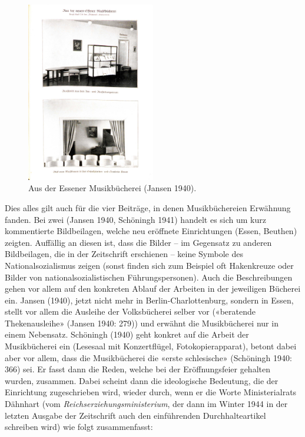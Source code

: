 \documentclass[a4paper,
fontsize=11pt,
oneside,
numbers=noperiodatend,
parskip=half-,
bibliography=totoc,
final
]{scrartcl}
\begin{document}
\begin{figure}
\centering
\includegraphics[width=0.5\textwidth]{files/Jansen_1940.jpg}
\caption{Aus der Essener Musikbücherei (Jansen 1940).}
\end{figure}

Dies alles gilt auch für die vier Beiträge, in denen Musikbüchereien
Erwähnung fanden. Bei zwei (Jansen 1940, Schöningh 1941) handelt es sich
um kurz kommentierte Bildbeilagen, welche neu eröffnete Einrichtungen
(Essen, Beuthen) zeigten. Auffällig an diesen ist, dass die Bilder -- im
Gegensatz zu anderen Bildbeilagen, die in der Zeitschrift erschienen --
keine Symbole des Nationalsozialismus zeigen (sonst finden sich zum
Beispiel oft Hakenkreuze oder Bilder von nationalsozialistischen
Führungspersonen). Auch die Beschreibungen gehen vor allem auf den
konkreten Ablauf der Arbeiten in der jeweiligen Bücherei ein. Jansen
(1940), jetzt nicht mehr in Berlin-Charlottenburg, sondern in Essen,
stellt vor allem die Ausleihe der Volksbücherei selber vor («beratende
Thekenausleihe» (Jansen 1940: 279)) und erwähnt die Musikbücherei nur in
einem Nebensatz. Schöningh (1940) geht konkret auf die Arbeit der
Musikbücherei ein (Lesesaal mit Konzertflügel, Fotokopierapparat),
betont dabei aber vor allem, dass die Musikbücherei die «erste
schlesische» (Schöningh 1940: 366) sei. Er fasst dann die Reden, welche
bei der Eröffnungsfeier gehalten wurden, zusammen. Dabei scheint dann
die ideologische Bedeutung, die der Einrichtung zugeschrieben wird,
wieder durch, wenn er die Worte Ministerialrats Dähnhart (vom
\emph{Reichserziehungsministerium}, der dann im Winter 1944 in der
letzten Ausgabe der Zeitschrift auch den einführenden Durchhalteartikel
schreiben wird) wie folgt zusammenfasst:
\end{document}
